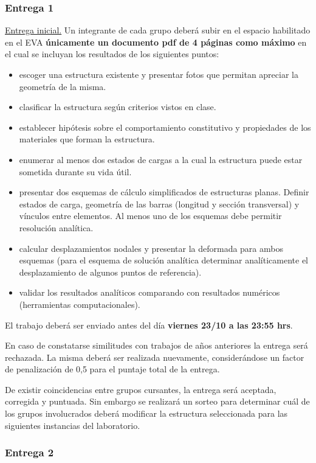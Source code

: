 \documentclass[a4paper,11pt,twocolumn]{article}
\begin{document}
\subsubsection{Entrega 1}
\underline{Entrega inicial.} %
%
Un integrante de cada grupo deberá subir en el espacio habilitado en el EVA \textbf{únicamente un documento pdf de 4 páginas como máximo} en el cual se incluyan los resultados de los siguientes puntos:
\begin{itemize}
  \item escoger una estructura existente y presentar fotos que permitan apreciar la geometría de la misma.
  \item clasificar la estructura según criterios vistos en clase.
  \item establecer hipótesis sobre el comportamiento constitutivo y propiedades de los materiales que forman la estructura.
  \item enumerar al menos dos estados de cargas a la cual la estructura puede estar sometida durante su vida útil.
  \item presentar dos esquemas de cálculo simplificados de estructuras planas. Definir estados de carga, geometría de las barras (longitud y sección transversal) y vínculos entre elementos. %
	Al menos uno de los esquemas debe permitir resolución analítica.
	\item calcular desplazamientos nodales y presentar la deformada para ambos esquemas (para el esquema de solución analítica determinar analíticamente el desplazamiento de algunos puntos de referencia).
	\item validar los resultados analíticos comparando con resultados numéricos (herramientas computacionales).
	
\end{itemize}	

El trabajo deberá ser enviado antes del día \textbf{viernes 23/10 a las 23:55 hrs}.
%

En caso de constatarse similitudes con trabajos de años anteriores la entrega será rechazada. La misma deberá ser realizada nuevamente, considerándose un factor de penalización de 0,5 para el puntaje total de la entrega.
%

De existir coincidencias entre grupos cursantes, la entrega será aceptada, corregida y puntuada. Sin embargo se realizará un sorteo para determinar cuál de los grupos involucrados deberá modificar la estructura seleccionada para las siguientes instancias del laboratorio.

\subsubsection{Entrega 2}
\end{document}
